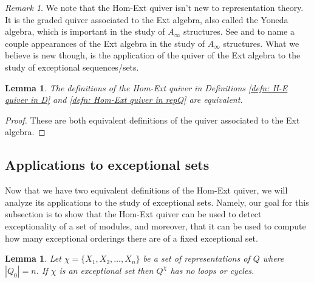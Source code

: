 \documentclass[12pt]{amsart}
\theoremstyle{plain}
\newtheorem{lem}[thm]{Lemma}
\theoremstyle{definition}
\theoremstyle{remark}
\newtheorem{rem}{Remark}[section]
\begin{document}
{\color{black} 
\begin{rem}
    We note that the Hom-Ext quiver isn't new to representation theory. It is the graded quiver associated to the Ext algebra, also called the Yoneda algebra, which is important in the study of $A_{\infty}$ structures. See \cite{keller2001introduction} and \cite{lu2009infinity} to name a couple appearances of the Ext algebra in the study of $A_{\infty}$ structures. What we believe is new though, is the application of the {\color{black}quiver of the} Ext algebra to the study of  exceptional sequences/sets.
\end{rem}
}

\begin{lem}
The definitions of the Hom-Ext quiver in Definitions \ref{defn: H-E quiver in D} and \ref{defn: Hom-Ext quiver in repQ} are equivalent.
\end{lem}

\begin{proof}
These are both equivalent definitions of the quiver associated to the Ext algebra.
\end{proof}


\subsection{Applications to exceptional sets}\label{sec: H-E quiver counts excepitonal orderings}

Now that we have two equivalent definitions of the Hom-Ext quiver, we will analyze its applications to the study of exceptional sets. Namely, our goal for this subsection is to show that the Hom-Ext quiver can be used to detect exceptionality of a set of modules, and moreover, that it can be used to compute how many exceptional orderings there are of a fixed exceptional set. 

\begin{lem}\label{lem: Hom-Ext quiver acyclic}
Let $\chi = \{X_1, X_2, \dots, X_n\}$ be a set of representations of $Q$ where $|Q_0| = n$. If $\chi$ is an exceptional set then $Q^{\chi}$ has no loops or cycles.
\end{lem}
\end{document}
